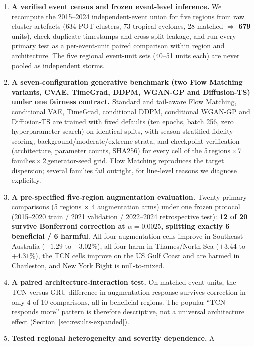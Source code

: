 \begin{enumerate}
    \item \textbf{A verified event census and frozen event-level inference.} We
    recompute the 2015--2024 independent-event union for five regions from raw
    cluster artefacts (634 POT clusters, 73 tropical cyclones, 28 matched
    $\Rightarrow$ \textbf{679} units), check duplicate timestamps and
    cross-split leakage, and run every primary test as a per-event-unit paired
    comparison within region and architecture. The five regional event-unit
    sets (40--51 units each) are never pooled as independent storms.
    \item \textbf{A seven-configuration generative benchmark (two Flow Matching
    variants, CVAE, TimeGrad, DDPM, WGAN-GP and Diffusion-TS) under one fairness
    contract.} Standard and tail-aware Flow Matching, conditional VAE,
    TimeGrad, conditional DDPM, conditional WGAN-GP and Diffusion-TS are
    trained with fixed defaults (ten epochs, batch 256, zero hyperparameter
    search) on identical splits, with season-stratified fidelity scoring,
    background/moderate/extreme strata, and checkpoint verification
    (architecture, parameter counts, SHA256) for every cell of the
    5\,regions\,$\times$\,7\,families\,$\times$\,2\,generator-seed grid. Flow
    Matching reproduces the target dispersion; several families fail outright,
    for line-level reasons we diagnose explicitly.
    \item \textbf{A pre-specified five-region augmentation evaluation.} Twenty
    primary comparisons (5 regions $\times$ 4 augmentation arms) under one
    frozen protocol (2015--2020 train / 2021 validation / 2022--2024
    retrospective test): \textbf{12 of 20 survive Bonferroni correction at
    $\alpha = 0.0025$, splitting exactly 6 beneficial / 6 harmful}. All four
    augmentation cells improve in Southeast Australia ($-1.29$ to
    $-3.02\%$), all four harm in Thames/North Sea ($+3.44$ to $+4.31\%$), the
    TCN cells improve on the US Gulf Coast and are harmed in Charleston, and
    New York Bight is null-to-mixed.
    \item \textbf{A paired architecture-interaction test.} On matched event
    units, the TCN-versus-GRU difference in augmentation response survives
    correction in only 4 of 10 comparisons, all in beneficial regions. The
    popular ``TCN responds more'' pattern is therefore descriptive, not a
    universal architecture effect (Section~\ref{sec:results-expanded}).
    \item \textbf{Tested regional heterogeneity and severity dependence.} A

\end{enumerate}
